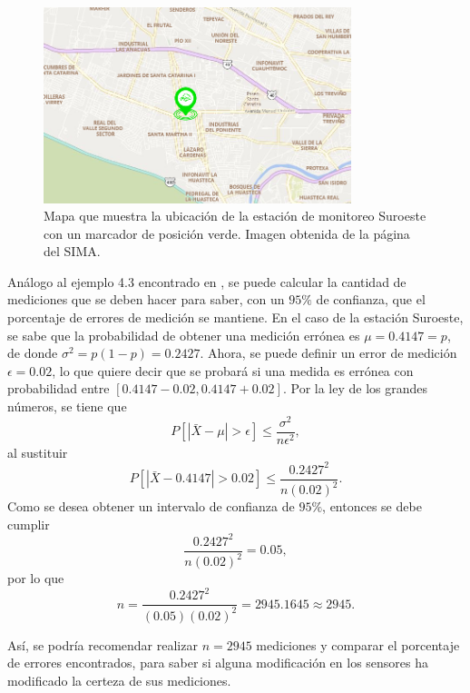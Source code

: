 \documentclass[paper=leter, fontsize=11pt]{scrartcl}
\begin{document}
\begin{figure}
  \centering
  \includegraphics[width=0.8\textwidth]{so.png}
\caption{Mapa que muestra la ubicación de la estación de monitoreo Suroeste con un marcador de posición verde. Imagen obtenida de la página del SIMA\cite{aireNL}.}
\label{fig:so_geo}
\end{figure}

Análogo al ejemplo 4.3 encontrado en \citet{Sedor2015}, se puede calcular la cantidad de mediciones que se deben hacer para saber, con un $95\%$ de confianza, que el porcentaje de errores de medición se mantiene. En el caso de la estación Suroeste, se sabe que la probabilidad de obtener una medición errónea es $\mu = 0.4147 = p$, de donde $\sigma^2 = p(1 - p) = 0.2427$. Ahora, se puede definir un error de medición $\epsilon = 0.02$, lo que quiere decir que se probará si una medida es errónea con probabilidad entre $[0.4147 - 0.02, 0.4147 + 0.02]$. Por la ley de los grandes números, se tiene que
$$P[|\bar{X} - \mu| > \epsilon] \leq \frac{\sigma^2}{n \epsilon^2},$$ 
al sustituir
$$P[|\bar{X} - 0.4147| > 0.02] \leq \frac{0.2427^2}{n (0.02)^2}.$$
Como se desea obtener un intervalo de confianza de $95\%$, entonces se debe cumplir
$$\frac{0.2427^2}{n (0.02)^2} = 0.05,$$
por lo que
$$n = \frac{0.2427^2}{(0.05) (0.02)^2} = 2945.1645 \approx 2945.$$

Así, se podría recomendar realizar $n = 2945$ mediciones y comparar el porcentaje de errores encontrados, para saber si alguna modificación en los sensores ha modificado la certeza de sus mediciones.
 


\end{document}
